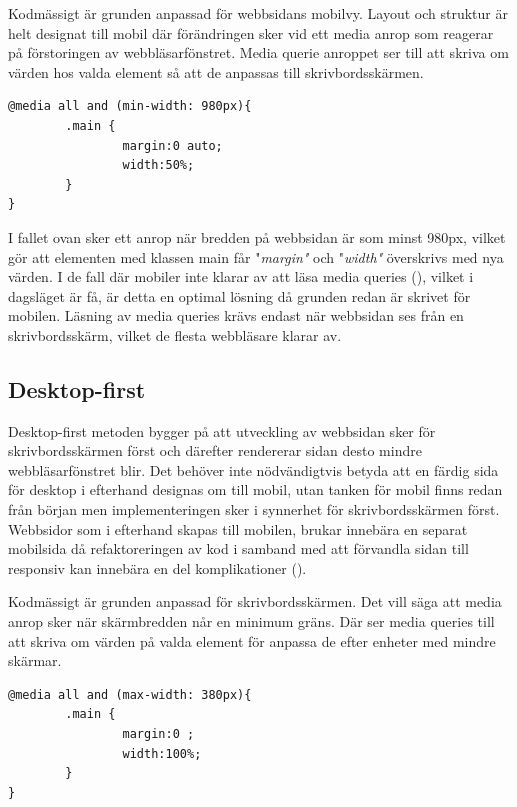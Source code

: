 \documentclass[11pt]{article}
\begin{document}
Kodmässigt är grunden anpassad för webbsidans mobilvy. Layout och struktur är helt designat till mobil där förändringen sker vid ett media anrop som reagerar på förstoringen av webbläsarfönstret. Media querie anroppet ser till att skriva om värden hos valda element så att de anpassas till skrivbordsskärmen.
 
\vspace{0.5cm}
 \begin{verbatim}
@media all and (min-width: 980px){
        .main {
                margin:0 auto;
                width:50%;
        }
}
\end{verbatim}

\vspace{0.5cm}
I fallet ovan sker ett anrop när bredden på webbsidan är som minst 980px, vilket gör att elementen med klassen main får "\textit{margin"} och "\textit{width"} överskrivs med nya värden. I de fall där mobiler inte klarar av att läsa media queries (\cite{adaptiveresp}), vilket i dagsläget är få, är detta en optimal lösning då grunden redan är skrivet för mobilen. Läsning av media queries krävs endast när webbsidan ses från en skrivbordsskärm, vilket de flesta webbläsare klarar av.

\subsection{Desktop-first}
Desktop-first metoden bygger på att utveckling av webbsidan sker för skrivbordsskärmen först och därefter rendererar sidan desto mindre webbläsarfönstret blir. Det behöver inte nödvändigtvis betyda att en färdig sida för desktop i efterhand designas om till mobil, utan tanken för mobil finns redan från början men implementeringen sker i synnerhet för skrivbordsskärmen först. Webbsidor som i efterhand skapas till mobilen, brukar innebära en separat mobilsida då refaktoreringen av kod i samband med att förvandla sidan till responsiv kan innebära en del komplikationer (\cite{adaptiveresp}).  

Kodmässigt är grunden anpassad för skrivbordsskärmen. Det vill säga att media anrop sker när skärmbredden når en minimum gräns. Där ser media queries till att skriva om värden på valda element för anpassa de efter enheter med mindre skärmar.


\vspace{0.5cm}
 \begin{verbatim}
@media all and (max-width: 380px){
        .main {
                margin:0 ;
                width:100%;
        }
}
\end{verbatim}
\vspace{0.5cm}
\end{document}
